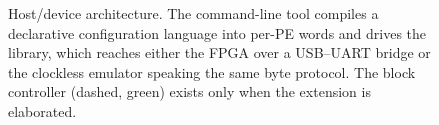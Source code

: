 \begin{figure}[t]
  \centering
  \resizebox{\columnwidth}{!}{}
  \caption{Host/device architecture. The command-line tool compiles a
  declarative configuration language into per-PE words and drives the library,
  which reaches either the FPGA over a USB--UART bridge or the clockless
  emulator speaking the same byte protocol. The block controller (dashed,
  green) exists only when the extension is elaborated.}
  \label{fig:stack}
\end{figure}
